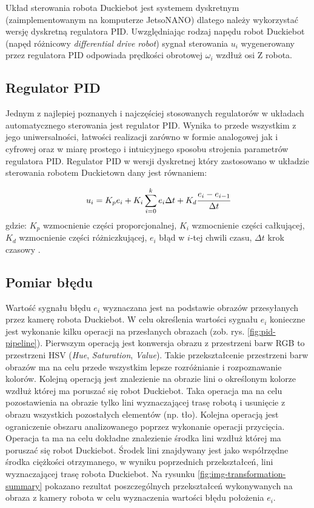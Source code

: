 \documentclass[conference]{IEEEtran}
\begin{document}
Układ sterowania robota Duckiebot jest systemem dyskretnym (zaimplementowanym na komputerze JetsoNANO) dlatego należy wykorzystać wersję dyskretną regulatora PID. Uwzględniając rodzaj napędu robot Duckiebot (napęd różnicowy \emph{differential drive robot}) sygnał sterowania $u_i$ wygenerowany przez regulatora PID odpowiada prędkości obrotowej $\omega_i$ wzdłuż osi Z robota.

\subsection{Regulator PID}
Jednym z najlepiej poznanych i najczęściej stosowanych regulatorów w układach automatycznego sterowania jest regulator PID. Wynika to przede wszystkim z jego uniwersalności, łatwości realizacji zarówno w formie analogowej jak i cyfrowej oraz w miarę prostego i intuicyjnego sposobu strojenia parametrów regulatora PID. Regulator PID w wersji dyskretnej który zastosowano w układzie sterowania robotem Duckietown dany jest równaniem:

\begin{equation}
u_i = K_p e_i + K_i \sum_{i=0}^k{e_i \Delta t} + K_d \cfrac{e_i-e_{i-1}}{\Delta t}
\label{eq:pid-dis}
\end{equation}
gdzie: $K_p$ wzmocnienie części proporcjonalnej, $K_i$ wzmocnienie części całkującej, $K_d$ wzmocnienie części różniczkującej, $e_i$ błąd w $i$-tej chwili czasu, $\Delta t$ krok czasowy \cite{aastrom2021feedback}.

\subsection{Pomiar błędu}
Wartość sygnału błędu $e_i$ wyznaczana jest na podstawie obrazów przesyłanych przez kamerę robota Duckiebot. W celu określenia wartości sygnału $e_i$ konieczne jest wykonanie kilku operacji na przesłanych obrazach (zob. rys. \ref{fig:pid-pipeline}). 
Pierwszym operacją jest konwersja obrazu z przestrzeni barw RGB to przestrzeni HSV (\emph{Hue}, \emph{Saturation}, \emph{Value}). Takie przekształcenie przestrzeni barw obrazów ma na celu przede wszystkim lepsze rozróżnianie i rozpoznawanie kolorów. 
Kolejną operacją jest znalezienie na obrazie lini o określonym kolorze wzdłuż której ma poruszać się robot Duckiebot. Taka operacja ma na celu pozostawienia na obrazie tylko lini wyznaczającej trasę robotą i usunięcie z obrazu wszystkich pozostałych elementów (np. tło). 
Kolejna operacją jest ograniczenie obszaru analizowanego poprzez wykonanie operacji przycięcia. Operacja ta ma na celu dokładne znalezienie środka lini wzdłuż której ma poruszać się robot Duckiebot. 
Środek lini znajdywany jest jako współrzędne środka ciężkości otrzymanego, w wyniku poprzednich przekształceń, lini wyznaczającej trasę robota Duckiebot. Na rysunku \ref{fig:img-transformation-summary} pokazano rezultat poszczególnych przekształceń wykonywanych na obraza z kamery robota w celu wyznaczenia wartości błędu położenia $e_i$.
\end{document}
